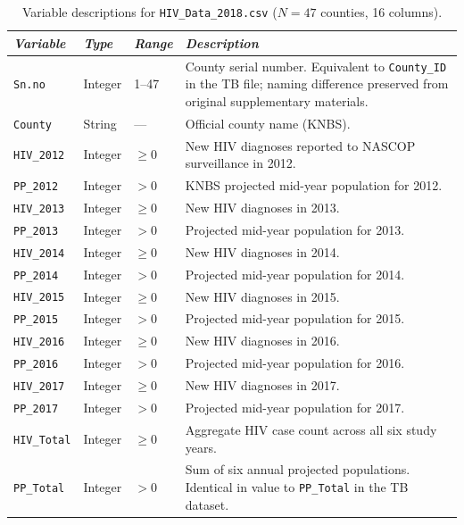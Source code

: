 \documentclass[11pt,a4paper]{article}
\newcommand{\code}[1]{\texttt{\small #1}}
\begin{document}
\begin{table}[H]
\caption{Variable descriptions for \texttt{HIV\_Data\_2018.csv} ($N=47$ counties, 16 columns).}
\renewcommand{\arraystretch}{1.10}
\scriptsize\begin{tabularx}{\textwidth}{@{}L{2.7cm}L{1.4cm}L{1.6cm}X@{}}
\toprule
\textit{Variable} & \textit{Type} & \textit{Range} & \textit{Description}\\
\midrule
\code{Sn.no}      & Integer & 1--47    & County serial number. Equivalent to \code{County\_ID} in the TB file; naming difference preserved from original supplementary materials.\\
\code{County}     & String  & ---      & Official county name (KNBS).\\
\code{HIV\_2012}  & Integer & $\geq 0$ & New HIV diagnoses reported to NASCOP surveillance in 2012.\\
\code{PP\_2012}   & Integer & $> 0$    & KNBS projected mid-year population for 2012.\\
\code{HIV\_2013}  & Integer & $\geq 0$ & New HIV diagnoses in 2013.\\
\code{PP\_2013}   & Integer & $> 0$    & Projected mid-year population for 2013.\\
\code{HIV\_2014}  & Integer & $\geq 0$ & New HIV diagnoses in 2014.\\
\code{PP\_2014}   & Integer & $> 0$    & Projected mid-year population for 2014.\\
\code{HIV\_2015}  & Integer & $\geq 0$ & New HIV diagnoses in 2015.\\
\code{PP\_2015}   & Integer & $> 0$    & Projected mid-year population for 2015.\\
\code{HIV\_2016}  & Integer & $\geq 0$ & New HIV diagnoses in 2016.\\
\code{PP\_2016}   & Integer & $> 0$    & Projected mid-year population for 2016.\\
\code{HIV\_2017}  & Integer & $\geq 0$ & New HIV diagnoses in 2017.\\
\code{PP\_2017}   & Integer & $> 0$    & Projected mid-year population for 2017.\\
\code{HIV\_Total} & Integer & $\geq 0$ & Aggregate HIV case count across all six study years.\\
\code{PP\_Total}  & Integer & $> 0$    & Sum of six annual projected populations. Identical in value to \code{PP\_Total} in the TB dataset.\\
\bottomrule
\end{tabularx}
\renewcommand{\arraystretch}{1.10}
\end{table}
\end{document}

